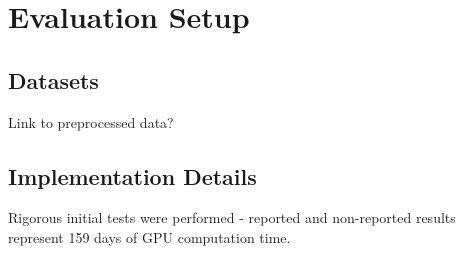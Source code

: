 \chapter{Evaluation Setup}

\section{Datasets}

{\color{red} Link to preprocessed data?}

\section{Implementation Details}

Rigorous initial tests were performed - reported and non-reported results represent 159 days of GPU computation time.